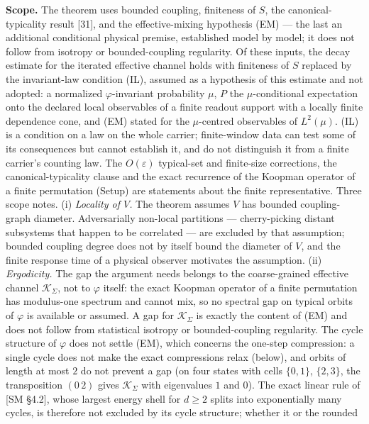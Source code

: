 \documentclass[
]{article}
\begin{document}
\textbf{Scope.} The theorem uses bounded coupling, finiteness of \(S\),
the canonical-typicality result {[}31{]}, and the effective-mixing
hypothesis (EM) --- the last an additional conditional physical premise,
established model by model; it does not follow from isotropy or
bounded-coupling regularity. Of these inputs, the decay estimate for the
iterated effective channel holds with finiteness of \(S\) replaced by
the invariant-law condition (IL), assumed as a hypothesis of this
estimate and not adopted: a normalized \(\varphi\)-invariant probability
\(\mu\), \(P\) the \(\mu\)-conditional expectation onto the declared
local observables of a finite readout support with a locally finite
dependence cone, and (EM) stated for the \(\mu\)-centred observables of
\(L^2(\mu)\). (IL) is a condition on a law on the whole carrier;
finite-window data can test some of its consequences but cannot
establish it, and do not distinguish it from a finite carrier's counting
law. The \(O(\varepsilon)\) typical-set and finite-size corrections, the
canonical-typicality clause and the exact recurrence of the Koopman
operator of a finite permutation (Setup) are statements about the finite
representative. Three scope notes. (i) \emph{Locality of \(V\).} The
theorem assumes \(V\) has bounded coupling-graph diameter. Adversarially
non-local partitions --- cherry-picking distant subsystems that happen
to be correlated --- are excluded by that assumption; bounded coupling
degree does not by itself bound the diameter of \(V\), and the finite
response time of a physical observer motivates the assumption. (ii)
\emph{Ergodicity.} The gap the argument needs belongs to the
coarse-grained effective channel \(\mathcal{K}_\Sigma\), not to
\(\varphi\) itself: the exact Koopman operator of a finite permutation
has modulus-one spectrum and cannot mix, so no spectral gap on typical
orbits of \(\varphi\) is available or assumed. A gap for
\(\mathcal{K}_\Sigma\) is exactly the content of (EM) and does not
follow from statistical isotropy or bounded-coupling regularity. The
cycle structure of \(\varphi\) does not settle (EM), which concerns the
one-step compression: a single cycle does not make the exact
compressions relax (below), and orbits of length at most \(2\) do not
prevent a gap (on four states with cells \(\{0,1\}\), \(\{2,3\}\), the
transposition \((0\,2)\) gives \(\mathcal{K}_\Sigma\) with eigenvalues
\(1\) and \(0\)). The exact linear rule of {[}SM §4.2{]}, whose largest
energy shell for \(d\ge2\) splits into exponentially many cycles, is
therefore not excluded by its cycle structure; whether it or the rounded
\end{document}
